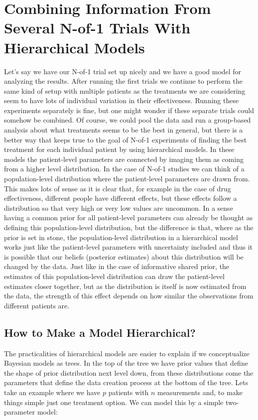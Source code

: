 \documentclass[12pt,a4paper,leqno]{report}
\theoremstyle{plain}
\theoremstyle{definition}
\theoremstyle{remark}
\begin{document}
\chapter{Combining Information From Several N-of-1 Trials With Hierarchical Models}\label{hierarchicalbayes}

Let's say we have our N-of-1 trial set up nicely and we have a good model for analyzing the
results. After running the first trials we continue to perform the same kind of setup
with multiple patients as the treatments we are considering seem to have lots of
individual variation in their effectiveness. Running these experiments separately is
fine, but one might wonder if these separate trials could somehow be combined. Of
course, we could pool the data and run a group-based
analysis about what treatments seems to be the best in general, but there is a better
way that keeps true to the goal of N-of-1 experiments of finding the best treatment for
each individual patient by using hierarchical models. In these models the
patient-level parameters are connected by imaging them as coming from a higher level
distribution. In the case of N-of-1 studies we can think of a population-level distribution
where the patient-level parameters are drawn from. This makes lots of sense as it is
clear that, for example in the case of drug effectiveness, different people have different
effects, but these effects follow a distribution so that very high or very low values are
uncommon. In a sense having a common prior for
all patient-level parameters can already be thought as defining this population-level
distribution, but the difference is that, where as the prior
is set in stone, the population-level
distribution in a hierarchical model works just like the patient-level
parameters with uncertainty included and thus it is possible that our beliefs (posterior
estimates) about this distribution will be changed by the data. Just like in the case of
informative shared prior,
the estimates of this population-level distribution can draw the
patient-level estimates closer together, but as the distribution is itself is now
estimated from the data, the strength of this effect depends on how similar the
observations from different patients are.

\section{How to Make a Model Hierarchical?}

The practicalities of hierarchical models are easier to explain if we conceptualize
Bayesian
models as trees. In the top of the tree we have prior values that define the shape of
prior distribution next level down, from these distributions come the parameters that
define the data creation process at the bottom of the tree. Lets take an example
where we have \(p\) patients with \(n\) measurements and, to make things simple just
one treatment option. We can model this by a simple two-parameter model:
\end{document}
